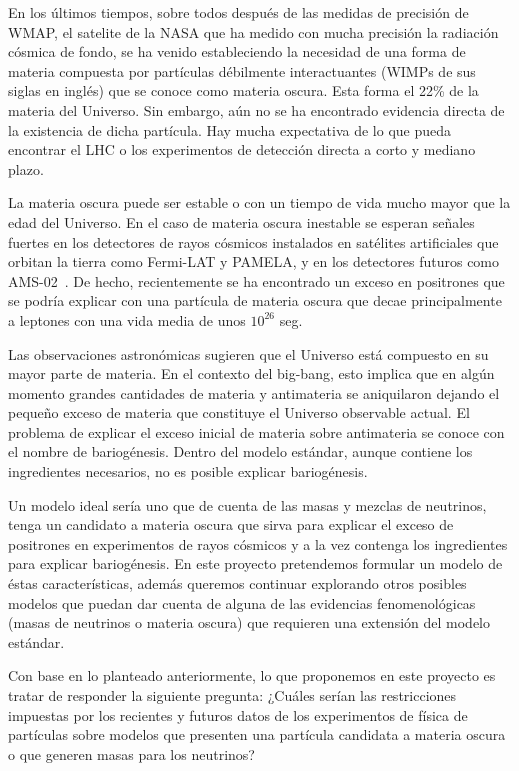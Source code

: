 En los últimos tiempos, sobre todos después de las medidas de
precisión de WMAP, el satelite de la NASA que ha medido con mucha
precisión la radiación cósmica de fondo, se ha venido estableciendo la
necesidad de una forma de materia compuesta por partículas débilmente
interactuantes (WIMPs de sus siglas en inglés) que se conoce como
materia oscura. Esta forma el 22\% de la materia del Universo. Sin
embargo, aún no se ha encontrado evidencia directa de la existencia de
dicha partícula. Hay mucha expectativa de lo que pueda encontrar el
LHC o los experimentos de detección directa a corto y mediano plazo.

La materia oscura puede ser estable o con un tiempo de vida mucho
mayor que la edad del Universo. En el caso de materia oscura inestable
se esperan señales fuertes en los detectores de rayos cósmicos
instalados en satélites artificiales que orbitan la tierra como
Fermi-LAT y PAMELA, y en los detectores futuros como
AMS-02~\cite{ams:2009}. De hecho, recientemente se ha encontrado un
exceso en positrones \cite{Adriani:2008zr} que se podría explicar con
una partícula de materia oscura que decae principalmente a leptones
con una vida media de unos $10^{26}$ seg.

Las observaciones astronómicas sugieren que el Universo está compuesto
en su mayor parte de materia. En el contexto del big-bang, esto
implica que en algún momento grandes cantidades de materia y
antimateria se aniquilaron dejando el pequeño exceso de materia que
constituye el Universo observable actual. El problema de explicar el
exceso inicial de materia sobre antimateria se conoce con el nombre de
bariogénesis. Dentro del modelo estándar, aunque contiene los
ingredientes necesarios, no es posible explicar bariogénesis.

Un modelo ideal sería uno que de cuenta de las masas y mezclas de
neutrinos, tenga un candidato a materia oscura que sirva para explicar
el exceso de positrones en experimentos de rayos cósmicos y a la vez
contenga los ingredientes para explicar bariogénesis.  En este
proyecto pretendemos formular un modelo de éstas características,
además queremos continuar explorando otros posibles modelos que puedan
dar cuenta de alguna de las evidencias fenomenológicas (masas de
neutrinos o materia oscura) que requieren una extensión del modelo
estándar.


\begin{proyecto}
  Con base en lo planteado anteriormente, lo que proponemos en este
  proyecto es tratar de responder la siguiente pregunta: ¿Cuáles
  serían las restricciones impuestas por los recientes y futuros datos
  de los experimentos de física de partículas sobre modelos que
  presenten una partícula candidata a materia oscura o que generen
  masas para los neutrinos?
\end{proyecto}
 

